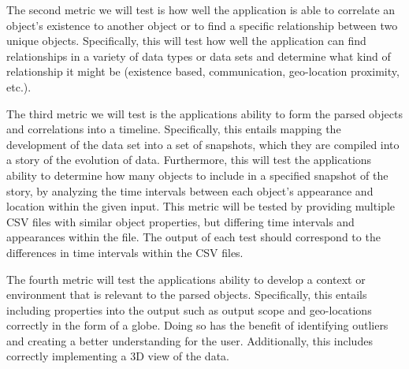 \documentclass[journal,10pt,onecolumn,compsoc]{IEEEtran} \usepackage[margin=1.0in]{geometry} \usepackage{pdfpages}
\begin{document}
    The second metric we will test is how well the application is able to correlate an object's existence to another object or to find a specific relationship between two unique objects. Specifically, this will test how well the application can find relationships in a variety of data types or data sets and determine what kind of relationship it might be (existence based, communication, geo-location proximity, etc.). 

    The third metric we will test is the applications ability to form the parsed objects and correlations into a timeline. Specifically, this entails mapping the development of the data set into a set of snapshots, which they are compiled into a story of the evolution of data. Furthermore, this will test the applications ability to determine how many objects to include in a specified snapshot of the story, by analyzing the time intervals between each object's appearance and location within the given input. This metric will be tested by providing multiple CSV files with similar object properties, but differing time intervals and appearances within the file. The output of each test should correspond to the differences in time intervals within the CSV files.

    The fourth metric will test the applications ability to develop a context or environment that is relevant to the parsed objects. Specifically, this entails including properties into the output such as output scope and geo-locations correctly in the form of a globe. Doing so has the benefit of identifying outliers and creating a better understanding for the user. Additionally, this includes correctly implementing a 3D view of the data.
 
 \newpage  



\end{document}
